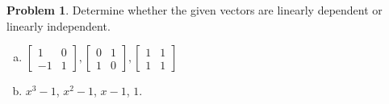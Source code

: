\documentclass[10pt]{article}
\theoremstyle{definition}
\newtheorem{problem}[theorem]{Problem}
\newcommand{\1}[1]{\textbf{1}_{\left[#1\right]}} %
\newcommand{\dempfcolor}[1]{{\color{RoyalBlue}#1}}
\newcommand{\demph}[1]{\dempfcolor{{\sl #1}}}
\begin{document}
\begin{problem}
  Determine whether the given vectors are linearly dependent or linearly
  independent.
  \begin{enumerate}[(a)]
    \item $\begin{bmatrix}
      1&0\\
      -1&1
    \end{bmatrix},
    \begin{bmatrix}
      0&1\\
      1&0
    \end{bmatrix},
    \begin{bmatrix}
      1&1\\
      1&1
    \end{bmatrix}$
    \item $x^{3}-1$, $x^{2}-1$, $x-1$, $1$. 
  \end{enumerate}
\end{problem}
\end{document}

